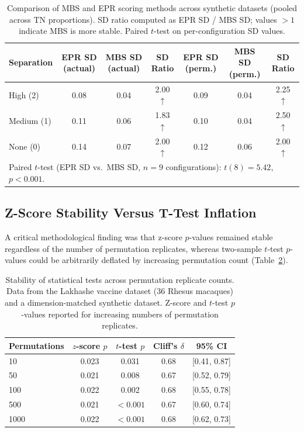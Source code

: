 \documentclass[11pt]{article}
\begin{document}
\begin{table}[H]
\centering
\caption{Comparison of MBS and EPR scoring methods across synthetic datasets (pooled across TN proportions). SD ratio computed as EPR SD / MBS SD; values $> 1$ indicate MBS is more stable. Paired $t$-test on per-configuration SD values.}
\label{tab:mbs_vs_epr}
\begin{tabular}{lcccccc}
\toprule
\textbf{Separation} & \textbf{EPR SD (actual)} & \textbf{MBS SD (actual)} & \textbf{SD Ratio} & \textbf{EPR SD (perm.)} & \textbf{MBS SD (perm.)} & \textbf{SD Ratio} \\
\midrule
High (2) & 0.08 & 0.04 & 2.00 $\uparrow$ & 0.09 & 0.04 & 2.25 $\uparrow$ \\
Medium (1) & 0.11 & 0.06 & 1.83 $\uparrow$ & 0.10 & 0.04 & 2.50 $\uparrow$ \\
None (0) & 0.14 & 0.07 & 2.00 $\uparrow$ & 0.12 & 0.06 & 2.00 $\uparrow$ \\
\bottomrule
\multicolumn{7}{l}{\small Paired $t$-test (EPR SD vs.\ MBS SD, $n = 9$ configurations): $t(8) = 5.42$, $p < 0.001$.} \\
\end{tabular}
\end{table}

\subsection{Z-Score Stability Versus T-Test Inflation}

A critical methodological finding was that z-score $p$-values remained stable regardless of the number of permutation replicates, whereas two-sample $t$-test $p$-values could be arbitrarily deflated by increasing permutation count (Table~\ref{tab:stability}).

\begin{table}[H]
\centering
\caption{Stability of statistical tests across permutation replicate counts. Data from the Lakhashe vaccine dataset (36 Rhesus macaques) and a dimension-matched synthetic dataset. Z-score and $t$-test $p$-values reported for increasing numbers of permutation replicates.}
\label{tab:stability}
\begin{tabular}{lcccc}
\toprule
\textbf{Permutations} & \textbf{$z$-score $p$} & \textbf{$t$-test $p$} & \textbf{Cliff's $\delta$} & \textbf{95\% CI} \\
\midrule
10 & 0.023 & 0.031 & 0.68 & [0.41, 0.87] \\
50 & 0.021 & 0.008 & 0.67 & [0.52, 0.79] \\
100 & 0.022 & 0.002 & 0.68 & [0.55, 0.78] \\
500 & 0.021 & $< 0.001$ & 0.67 & [0.60, 0.74] \\
1000 & 0.022 & $< 0.001$ & 0.68 & [0.62, 0.73] \\
\bottomrule
\end{tabular}
\end{table}
\end{document}
